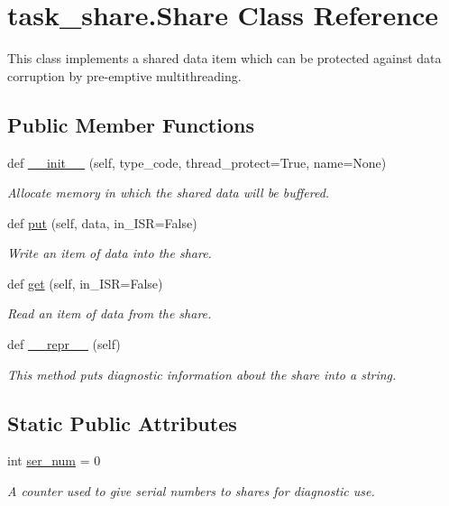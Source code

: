 \hypertarget{classtask__share_1_1Share}{}\section{task\+\_\+share.\+Share Class Reference}
\label{classtask__share_1_1Share}


This class implements a shared data item which can be protected against data corruption by pre-\/emptive multithreading.  


\subsection*{Public Member Functions}
\begin{DoxyCompactItemize}
\item 
def \hyperlink{classtask__share_1_1Share_a3139fd0c5d1df7fc15e003892d557b9a}{\+\_\+\+\_\+init\+\_\+\+\_\+} (self, type\+\_\+code, thread\+\_\+protect=True, name=None)
\begin{DoxyCompactList}\small\item\em Allocate memory in which the shared data will be buffered. \end{DoxyCompactList}\item 
def \hyperlink{classtask__share_1_1Share_ab449c261f259db176ffeea55ccbf5d96}{put} (self, data, in\+\_\+\+I\+SR=False)
\begin{DoxyCompactList}\small\item\em Write an item of data into the share. \end{DoxyCompactList}\item 
def \hyperlink{classtask__share_1_1Share_a599cd89ed1cd79af8795a51d8de70d27}{get} (self, in\+\_\+\+I\+SR=False)
\begin{DoxyCompactList}\small\item\em Read an item of data from the share. \end{DoxyCompactList}\item 
def \hyperlink{classtask__share_1_1Share_a09c1c075ae99ea33030dd9de7b9ae470}{\+\_\+\+\_\+repr\+\_\+\+\_\+} (self)
\begin{DoxyCompactList}\small\item\em This method puts diagnostic information about the share into a string. \end{DoxyCompactList}\end{DoxyCompactItemize}
\subsection*{Static Public Attributes}
\begin{DoxyCompactItemize}
\item 
int \hyperlink{classtask__share_1_1Share_a2e8df029af46fbfd44ef0c2e7e8c7af6}{ser\+\_\+num} = 0
\begin{DoxyCompactList}\small\item\em A counter used to give serial numbers to shares for diagnostic use. \end{DoxyCompactList}\end{DoxyCompactItemize}


